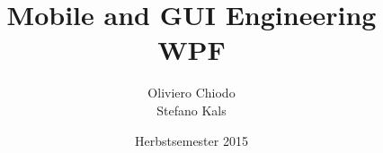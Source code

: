 \documentclass[a4paper,9pt]{extarticle}
\title{Mobile and GUI Engineering\\\Large WPF}
\author{Oliviero Chiodo\\ Stefano Kals}
\date{Herbstsemester 2015}
\affil{Hochschule für Technik Rapperswil}
\begin{document}
\maketitle
\clearpage
\raggedright
\footnotesize
\begin{multicols*}{3}

\setlength{\premulticols}{1pt}
\setlength{\postmulticols}{1pt}
\setlength{\multicolsep}{1pt}
\setlength{\columnsep}{2pt}





\end{multicols*}
\end{document}
